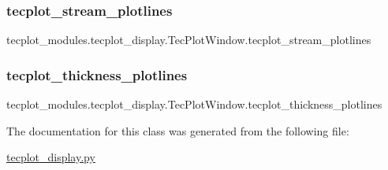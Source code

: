 \subsubsection{\texorpdfstring{tecplot\+\_\+stream\+\_\+plotlines}{tecplot\_stream\_plotlines}}
{\footnotesize\ttfamily tecplot\+\_\+modules.\+tecplot\+\_\+display.\+Tec\+Plot\+Window.\+tecplot\+\_\+stream\+\_\+plotlines}

\hypertarget{classtecplot__modules_1_1tecplot__display_1_1_tec_plot_window_a3291e8bf0c5c69a20e3e9299dc363db2}{}\label{classtecplot__modules_1_1tecplot__display_1_1_tec_plot_window_a3291e8bf0c5c69a20e3e9299dc363db2} 
\subsubsection{\texorpdfstring{tecplot\+\_\+thickness\+\_\+plotlines}{tecplot\_thickness\_plotlines}}
{\footnotesize\ttfamily tecplot\+\_\+modules.\+tecplot\+\_\+display.\+Tec\+Plot\+Window.\+tecplot\+\_\+thickness\+\_\+plotlines}



The documentation for this class was generated from the following file\+:\begin{DoxyCompactItemize}
\item 
\hyperlink{tecplot__display_8py}{tecplot\+\_\+display.\+py}\end{DoxyCompactItemize}
